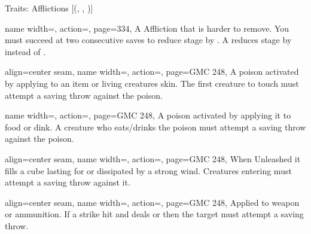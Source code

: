 \begin{PageFront}
\begin{Tables}{\frontTableHeight}
\begin{Table}{Traits: Afflictions }[{(, , )}]
\begin{entry}{}{%
                name width=\conditionLength,%
                action=\Virulent,
                page=334,
            }
                A Affliction that is harder to remove. You must succeed at two consecutive saves to reduce stage by . A  reduces stage by  instead of .
            \end{entry}
            \breakLine
            \begin{entry}{}{%
                align=center seam,
                name width=\conditionLength,%
                action=\Contact,
                page=GMC 248,
            }
                A poison activated by applying to an item or living creatures skin.
                The first creature to touch must attempt a saving throw against the poison.\\
            \end{entry}
            \begin{entry}{}{%
                name width=\conditionLength,%
                action=\Ingested,
                page=GMC 248,
            }
                A poison activated by applying it to food or dink.
                A creature who eats/drinks the poison must attempt a saving throw against the poison.
            \end{entry}
            \begin{entry}{}{%
                align=center seam,
                name width=\conditionLength,%
                action=\Inhaled,
                page=GMC 248,
            }%
                When Unleashed it fills a  cube lasting for  or dissipated by a strong wind.
                Creatures entering must attempt a saving throw against it. \\
            \end{entry}
            \begin{entry}{}{%
                align=center seam,
                name width=\conditionLength,%
                action=\Injury,
                page=GMC 248,
            }
                Applied to weapon or ammunition. If a strike hit and deals  or  then
                the target must attempt a saving throw. \\
                \hfill
            \end{entry}

\end{Table}
\end{Tables}
\end{PageFront}
